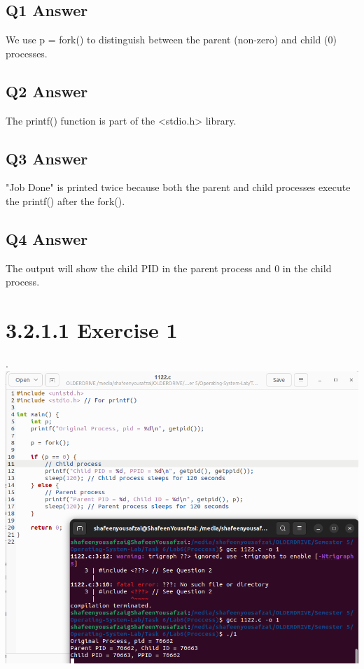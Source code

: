 \documentclass[12pt]{article}
\begin{document}
\subsection{Q1 Answer}
We use p = fork() to distinguish between the parent (non-zero) and child (0) processes.

\subsection{Q2 Answer}
The printf() function is part of the <stdio.h> library.
\subsection{Q3 Answer}
"Job Done" is printed twice because both the parent and child processes execute the printf() after the fork().
\subsection{Q4 Answer}
The output will show the child PID in the parent process and 0 in the child process.
\section{3.2.1.1 Exercise 1}.
  \includegraphics[width=\textwidth]{Screenshot from 2024-09-27 05-54-07.png}
\end{document}
